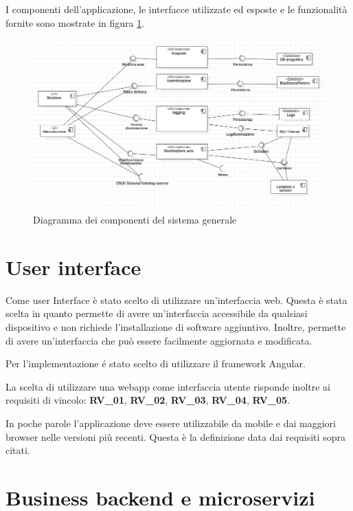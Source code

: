 I componenti dell'applicazione, le interfacce utilizzate ed esposte e le funzionalità fornite sono mostrate in figura \ref{fig:high-level-diagram}.

\begin{figure}[ht]
    \centering
    \includegraphics[width=\textwidth]{img/high-level-diagram.png}
    \caption{Diagramma dei componenti del sistema generale}
    \label{fig:high-level-diagram}
\end{figure}


\section{User interface}

Come user Interface è stato scelto di utilizzare un'interfaccia web. Questa è stata scelta in quanto permette di avere un'interfaccia accessibile da qualsiasi dispositivo e non richiede l'installazione di software aggiuntivo. Inoltre, permette di avere un'interfaccia che può essere facilmente aggiornata e modificata.

Per l'implementazione é stato scelto di utilizzare il framework Angular.

La scelta di utilizzare una webapp come interfaccia utente risponde inoltre ai requisiti di vincolo: \textbf{RV\_01}, \textbf{RV\_02}, \textbf{RV\_03}, \textbf{RV\_04}, \textbf{RV\_05}.

In poche parole l'applicazione deve essere utilizzabile da mobile e dai maggiori browser nelle versioni più recenti. Questa è la definizione data dai requisiti sopra citati.

\section{Business backend e microservizi}

